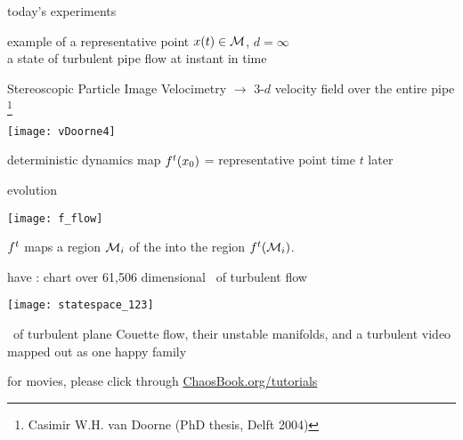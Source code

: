 \begin{frame}{today's experiments}
\begin{block}{example of a representative point }
$x(t) \in {\cal M}$, $d= \infty$ \\
a state of turbulent pipe flow at instant in time
\end{block}

\bigskip

Stereoscopic Particle Image Velocimetry $\to$
3-$d$ velocity field over the entire pipe%
\footnote{
Casimir W.H. van Doorne
(PhD thesis, Delft  2004)
}

\bigskip

\begin{center}
\texttt{[image: vDoorne4]}
\end{center}
\end{frame}

\begin{frame}{}
\begin{block}{deterministic dynamics}
map ${f^t}({x_0})$ =
representative point time $t$ later
\end{block}

\begin{block}{evolution}
\begin{center}
\texttt{[image: f\_flow]}
\end{center}
${f^t}$ maps a region ${\cal M}_i$ of
the {\statesp} into the region ${f^{t}({\cal M}_i)}$.
\end{block}
\end{frame}

\begin{frame}{have : chart over 61,506 dimensional \statesp\ of turbulent flow}
\begin{center}
\texttt{[image: statespace\_123]}
\end{center}
\eqva\ of turbulent plane Couette flow,
their unstable manifolds, and a turbulent video mapped out as one happy family

\bigskip

\hfill   {\small
          for movies, please click through
            \textcolor{blue}{\href{http://ChaosBook.org/tutorials}
             {ChaosBook.org/tutorials}}
          }
\end{frame}


